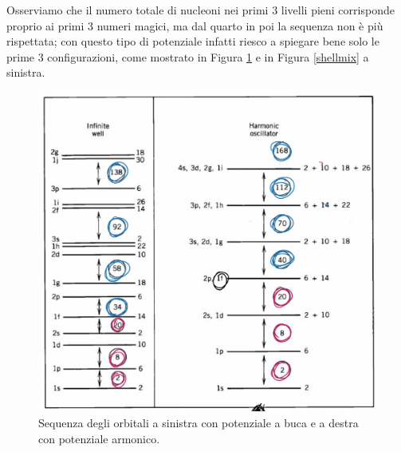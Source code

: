 Osserviamo che il numero totale di nucleoni nei primi 3 livelli pieni corrisponde proprio ai primi 3 numeri magici, ma dal quarto in poi la sequenza non è più rispettata; con questo tipo di potenziale infatti riesco a spiegare bene solo le prime 3 configurazioni, come mostrato in Figura \ref{shell} e in Figura \ref{shellmix} a sinistra.
\begin{figure}[h]
    \centering
    \includegraphics[scale=0.25]{Immagini/shell.png}
    \caption{Sequenza degli orbitali a sinistra con potenziale a buca e a destra con potenziale armonico.}
    \label{shell}
\end{figure}

